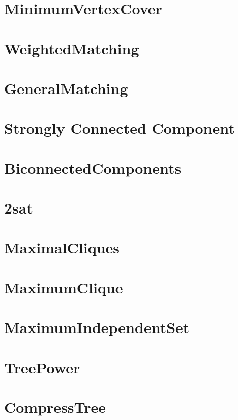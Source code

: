 \section{MinimumVertexCover}
\section{WeightedMatching}
\section{GeneralMatching}

\section{Strongly Connected Component}
\section{BiconnectedComponents}
\section{2sat}

\section{MaximalCliques}
\section{MaximumClique}
\section{MaximumIndependentSet}

\section{TreePower}
\section{CompressTree}
